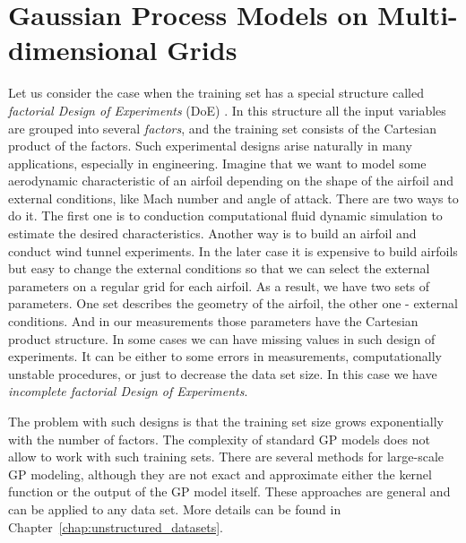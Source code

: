 \chapter{Gaussian Process Models on Multi-dimensional Grids}
\label{chap:gp_on_grids}




Let us consider the case when the training set has a special structure
called {\em factorial Design of Experiments} (DoE) \citep{Montgomery2006DAE}.
In this structure all the input variables are grouped into several {\em factors},
and the training set consists of the Cartesian product of the factors.
Such experimental designs arise naturally in many applications, especially in engineering.
Imagine that we want to model some aerodynamic characteristic of an airfoil depending
on the shape of the airfoil and external conditions, like Mach number and angle of attack.
There are two ways to do it.
The first one is to conduction computational fluid dynamic simulation to estimate
the desired characteristics.
Another way is to build an airfoil and conduct wind tunnel experiments.
In the later case it is expensive to build airfoils but easy to change the external
conditions so that we can select the external parameters on a regular grid
for each airfoil.
As a result, we have two sets of parameters.
One set describes the geometry of the airfoil, the other one - external conditions.
And in our measurements those parameters have the Cartesian product structure.
In some cases we can have missing values in such design of experiments.
It can be either to some errors in measurements, computationally unstable procedures,
or just to decrease the data set size.
In this case we have {\em incomplete factorial Design of Experiments}.

The problem with such designs is that the training set size grows exponentially
with the number of factors.
The complexity of standard GP models does not allow to work with such training sets.
There are several methods for large-scale GP modeling, although they are not exact
and approximate either the kernel function or the output of the GP model itself.
These approaches are general and can be applied to any data set.
More details can be found in Chapter~\ref{chap:unstructured_datasets}.

